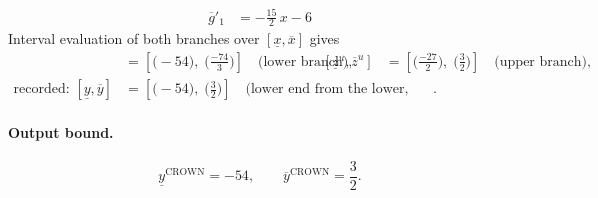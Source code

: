 \documentclass[11pt]{article}
\begin{document}
\begin{align*}
\overline{g}'_{1} &= -\frac{15}{2}\,x - 6
\end{align*}
Interval evaluation of both branches over $[\underline{x}, \overline{x}]$ gives
\begin{align*}
[\underline{z}^{\ell}, \overline{z}^{\ell}] &= [\bigl(-54\bigr),\; \bigl(\frac{-74}{3}\bigr)] \quad\text{(lower branch)}, & [\underline{z}^{u}, \overline{z}^{u}] &= [\bigl(\frac{-27}{2}\bigr),\; \bigl(\frac{3}{2}\bigr)] \quad\text{(upper branch)}, \\
\text{recorded: } [\underline{y}, \overline{y}] &= [\bigl(-54\bigr),\; \bigl(\frac{3}{2}\bigr)] \quad\text{(lower end from the lower, upper end from the upper branch)}.
\end{align*}
\paragraph{Output bound.}
\begin{equation*}
\underline{y}^{\text{CROWN}} = -54, \qquad \overline{y}^{\text{CROWN}} = \frac{3}{2}.
\end{equation*}
\end{document}
